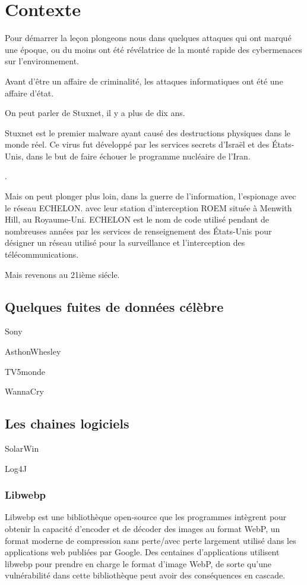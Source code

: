 
\section{Contexte}

Pour démarrer la leçon plongeons nous dans quelques attaques qui ont marqué une époque, ou du moins ont été révélatrice de la monté rapide des cybermenaces sur l'environnement.

Avant d'être un affaire de criminalité, les attaques informatiques ont été une affaire d'état.

On peut parler de Stuxnet, il y a plus de dix ans.

Stuxnet est le premier malware ayant causé des destructions physiques dans le monde réel. Ce virus fut développé par les services secrets d'Israël et des États-Unis, dans le but de faire échouer le programme nucléaire de l'Iran.

.

Mais on peut plonger plus loin, dans la guerre de l'information, l'espionage avec le réseau ECHELON. avec leur station d'interception ROEM située à Menwith Hill, au Royaume-Uni.
ECHELON est le nom de code utilisé pendant de nombreuses années par les services de renseignement des États-Unis pour désigner un réseau utilisé pour la surveillance et l'interception des télécommunications.

Mais revenons au 21ième siécle.




\subsection{Quelques fuites de données célèbre}

Sony

AsthonWhesley


TV5monde

WannaCry 

\subsection{Les chaines logiciels}

SolarWin

Log4J

\subsubsection{Libwebp}
Libwebp est une bibliothèque open-source que les programmes intègrent pour obtenir la capacité d'encoder et de décoder des images au format WebP, un format moderne de compression sans perte/avec perte largement utilisé dans les applications web publiées par Google. Des centaines d'applications utilisent libwebp pour prendre en charge le format d'image WebP, de sorte qu'une vulnérabilité dans cette bibliothèque peut avoir des conséquences en cascade.

